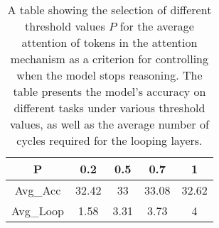 \begin{table}[]
\centering
\small  %
\caption{
A table showing the selection of different threshold values \( P \) for the average attention of tokens in the attention mechanism as a criterion for controlling when the model stops reasoning. The table presents the model's accuracy on different tasks under various threshold values, as well as the average number of cycles required for the looping layers.
}



\label{tab:adaptive}
\begin{tabular}{c|cccc}
\hline

\textbf{P} & \textbf{0.2} & \textbf{0.5} & \textbf{0.7} & 1     \\ \hline
Avg\_Acc   & 32.42        & 33        & 33.08        & 32.62 \\ \hline
Avg\_Loop  & 1.58         & 3.31         & 3.73         & 4     \\ \hline
\end{tabular}
 \vspace{-0.8cm}
\end{table}